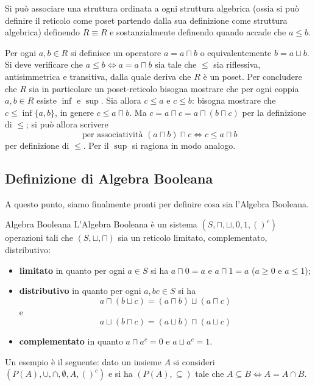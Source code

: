 Si può associare una struttura ordinata 
a ogni struttura algebrica (ossia si può definire 
il reticolo come poset partendo dalla 
sua definizione come struttura algebrica)
definendo $R \equiv R$ e 
sostanzialmente definendo quando accade che $a \leq b$.

Per ogni $a, b \in R$ si definisce un operatore 
$ a = a \sqcap b $ o equivalentemente $b = a \sqcup b$. 
Si deve verificare che $a \leq b \iff a = a \sqcap b$ sia tale 
che $\leq$ sia riflessiva, antisimmetrica e transitiva, 
dalla quale deriva che $R$ è un poset. 
Per concludere che $R$ sia in particolare un poset-reticolo bisogna mostrare 
che per ogni coppia $a,b \in R$ esiste $\inf$ e $\sup$. 
Sia allora $c \leq a$ e $ c \leq b$: bisogna mostrare 
che $c \leq \inf\{a,b\}$, in genere 
$c \leq a \sqcap b$. 
Ma $c = a \sqcap c = a \sqcap (b \sqcap c)$ per la definizione di 
$\leq$; si può allora scrivere 
$$
\text{ per associatività }(a \sqcap b) \sqcap c \iff c \leq a \sqcap b 
$$
per definizione di $\leq$. Per il $\sup$ si ragiona 
in modo analogo. 


\subsection{Definizione di Algebra Booleana}
A questo punto, siamo finalmente pronti per definire cosa sia l'Algebra Booleana.
\begin{defi}{Algebra Booleana}
L'Algebra Booleana è un sistema $(S, \sqcap, \sqcup, 0, 1, ()^c)$ operazioni 
tali che $(S,\sqcup,\sqcap)$ sia un reticolo limitato, complementato, 
distributivo:
\begin{itemize}
        \item \textbf{limitato} in quanto per ogni $a \in S$ si ha $a \sqcap 0 = a$ e $a \sqcap 1 = a$ ($ a \geq 0$ e $ a \leq 1$); 
        \item \textbf{distributivo} in quanto per ogni $a,b c \in S$ si ha 
                $$
                a \sqcap (b \sqcup c) = (a \sqcap b) \sqcup (a \sqcap c)
                $$ e 
                $$
                a \sqcup (b \sqcap c) = (a \sqcup b) \sqcap ( a \sqcup c)
                $$
        \item \textbf{complementato} in quanto $a \sqcap a^c = 0$ e $a \sqcup a^c = 1$. 
\end{itemize}
\end{defi}

Un esempio è il seguente: dato un insieme $A$ si consideri 
$(P(A), \cup, \cap, \emptyset, A, ()^c)$ e si ha 
$(P(A), \subseteq)$ tale che $A \subseteq B \iff A = A \cap B$. 

